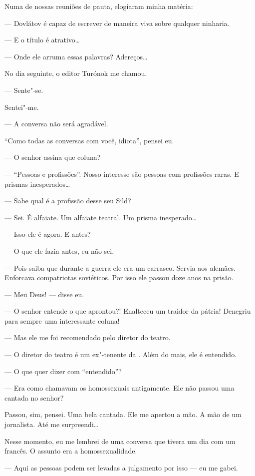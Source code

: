 Numa de nossas reuniões de pauta, elogiaram minha matéria:

--- Dovlátov é capaz de escrever de maneira viva sobre qualquer
ninharia.

--- E o título é atrativo\ldots{}

--- Onde ele arruma essas palavras? Adereços\ldots{}

No dia seguinte, o editor Turónok me chamou.

--- Sente"-se.

Sentei"-me.

--- A conversa não será agradável.

``Como todas as conversas com você, idiota'', pensei eu.

--- O senhor assina que coluna?

--- ``Pessoas e profissões''. Nosso interesse são pessoas com
profissões raras. E prismas inesperados\ldots{}

--- Sabe qual é a profissão desse seu Sild?

--- Sei. É alfaiate. Um alfaiate teatral. Um prisma
inesperado\ldots{}

--- Isso ele é agora. E antes?

--- O que ele fazia antes, eu não sei.

--- Pois saiba que durante a guerra ele era um carrasco. Servia
aos alemães. Enforcava compatriotas soviéticos. Por isso ele passou doze
anos na prisão.

--- Meu Deus! --- disse eu.

--- O senhor entende o que aprontou?! Enalteceu um traidor da
pátria! Denegriu para sempre uma interessante coluna!

--- Mas ele me foi recomendado pelo diretor do teatro.

--- O diretor do teatro é um ex"-tenente da . Além do mais, ele
é entendido.

--- O que quer dizer com ``entendido''?

--- Era como chamavam os homossexuais antigamente. Ele não passou
uma cantada no senhor?

Passou, sim, pensei. Uma bela cantada. Ele me apertou a mão. A mão de um
jornalista. Até me surpreendi\ldots{}

Nesse momento, eu me lembrei de uma conversa que tivera um dia com um
francês. O assunto era a homossexualidade.

--- Aqui as pessoas podem ser levadas a julgamento por isso
--- eu me gabei.

